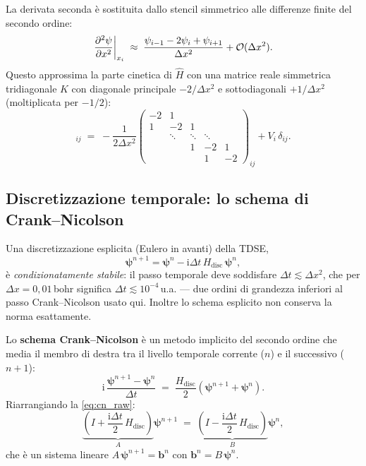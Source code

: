 \documentclass[12pt, a4paper]{article}
\newcommand{\dt}{\Delta t}
\newcommand{\dx}{\Delta x}
\newcommand{\ii}{\mathrm{i}}          %
\newcommand{\CN}{Crank--Nicolson}
\newcommand{\Htop}{\hat{H}}
\begin{document}
La derivata seconda è sostituita dallo stencil simmetrico alle
differenze finite del secondo ordine:
\begin{equation}
  \pdv[2]{\psi}{x}\bigg|_{x_i}
  \;\approx\;
  \frac{\psi_{i-1} - 2\psi_i + \psi_{i+1}}{\dx^2}
  + \mathcal{O}(\dx^2).
  \label{eq:fd_stencil}
\end{equation}
Questo approssima la parte cinetica di $\Htop$ con una matrice reale
simmetrica tridiagonale $K$ con diagonale principale $-2/\dx^2$ e
sottodiagonali $+1/\dx^2$ (moltiplicata per $-1/2$):
\begin{equation}
  [H_\text{disc}]_{ij}
  \;=\;
  -\frac{1}{2\dx^2}\begin{pmatrix}
    -2 & 1 \\
    1 & -2 & 1 \\
      & \ddots & \ddots & \ddots \\
      &        & 1 & -2 & 1 \\
      &        &   & 1  & -2
  \end{pmatrix}_{ij}
  + V_i\,\delta_{ij}.
  \label{eq:Hdisc}
\end{equation}

\subsection{Discretizzazione temporale: lo schema di Crank--Nicolson}

Una discretizzazione esplicita (Eulero in avanti) della TDSE,
\begin{equation}
  \boldsymbol{\psi}^{n+1} = \boldsymbol{\psi}^n
  - \ii\dt\, H_\text{disc}\,\boldsymbol{\psi}^n,
\end{equation}
è \emph{condizionatamente stabile}: il passo temporale deve soddisfare
$\dt \lesssim \dx^2$, che per $\dx = 0{,}01$\,bohr significa
$\dt \lesssim 10^{-4}$\,u.a. --- due ordini di grandezza inferiori
al passo \CN{} usato qui.  Inoltre lo schema esplicito non conserva
la norma esattamente.

Lo \textbf{schema \CN{}} \cite{CrankNicolson1947} è un metodo
implicito del secondo ordine che media il membro di destra tra il
livello temporale corrente ($n$) e il successivo ($n+1$):
\begin{equation}
  \ii\,\frac{\boldsymbol{\psi}^{n+1} - \boldsymbol{\psi}^n}{\dt}
  \;=\;
  \frac{H_\text{disc}}{2}\!\left(\boldsymbol{\psi}^{n+1}
  + \boldsymbol{\psi}^n\right).
  \label{eq:cn_raw}
\end{equation}
Riarrangiando la \eqref{eq:cn_raw}:
\begin{equation}
  \underbrace{\left(I + \frac{\ii\dt}{2}\,H_\text{disc}\right)}_{A}
  \boldsymbol{\psi}^{n+1}
  \;=\;
  \underbrace{\left(I - \frac{\ii\dt}{2}\,H_\text{disc}\right)}_{B}
  \boldsymbol{\psi}^n,
  \label{eq:cn_system}
\end{equation}
che è un sistema lineare $A\,\boldsymbol{\psi}^{n+1} = \mathbf{b}^n$
con $\mathbf{b}^n = B\,\boldsymbol{\psi}^n$.
\end{document}
